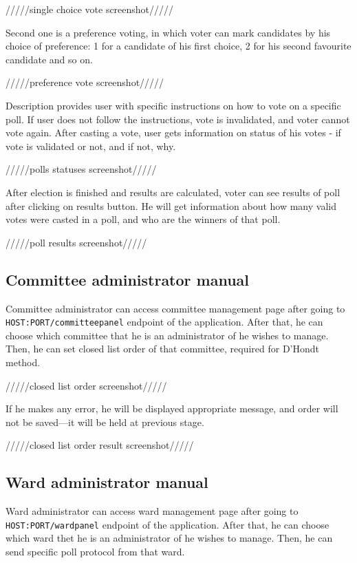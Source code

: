 \documentclass[a4paper,twoside,12pt]{book}
\begin{document}
      /////single choice vote screenshot/////

      Second one is a preference voting, in which voter can mark candidates by his choice of preference:
      1 for a candidate of his first choice, 2 for his second favourite candidate and so on.

      /////preference vote screenshot/////

      Description provides user with specific instructions on how to vote on a specific poll. If user does not follow the instructions, vote is invalidated, and voter cannot vote again.
      After casting a vote, user gets information on status of his votes - if vote is validated or not, and if not, why.

      /////polls statuses screenshot/////

      After election is finished and results are calculated, voter can see results of poll after clicking on results button.
      He will get information about how many valid votes were casted in a poll, and who are the winners of that poll.

      /////poll results screenshot/////

    \subsection{Committee administrator manual}
      Committee administrator can access committee management page after going to \lstinline|HOST:PORT/committeepanel| endpoint of the application.
      After that, he can choose which committee that he is an administrator of he wishes to manage.
      Then, he can set closed list order of that committee, required for D'Hondt method.

      /////closed list order screenshot/////

      If he makes any error, he will be displayed appropriate message, and order will not be saved---it will be held at previous stage.

      /////closed list order result screenshot/////

    \subsection{Ward administrator manual}
      Ward administrator can access ward management page after going to \lstinline|HOST:PORT/wardpanel| endpoint of the application.
      After that, he can choose which ward thet he is an administrator of he wishes to manage.
      Then, he can send specific poll protocol from that ward.
\end{document}
